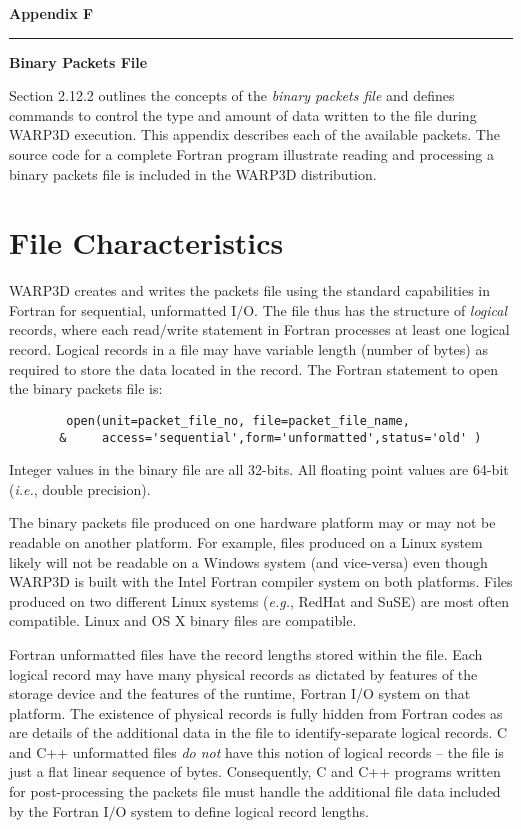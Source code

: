 \documentclass[10pt]{report}
\numberwithin{equation}{section}
\newcommand{\eg}{\ti{e.g.},\xspace}
\newcommand{\ie}{\ti{i.e.},\xspace}
\newcommand{\ti}{\emph}
\begin{document}
\LARGE
\hfill
\textbf{Appendix F}
\rule[0.15in]{450pt}{0.5mm}
\LARGE
\begin{flushright}
 \textbf{
{\selectfont Binary Packets File}}
\end{flushright}
\normalsize
%
%
Section 2.12.2 outlines the concepts of the \ti{binary packets file} and defines 
commands to control the type and amount of data
written to the file during WARP3D execution. This 
appendix describes each of the available packets. The source
code for a complete Fortran
program illustrate reading and processing a binary packets file
is included in the WARP3D distribution.
%
%
\section{File Characteristics }

WARP3D creates and writes the packets file using the standard capabilities in Fortran 
for sequential, unformatted I$/$O. The file thus has the structure of \ti{logical} records, 
where each read$/$write statement in Fortran processes at least one logical 
record. Logical records in a file may have variable length (number of bytes)
as required to store the data located 
in the record. The Fortran statement to open the binary packets file is:
\begin{verbatim}
        open(unit=packet_file_no, file=packet_file_name,   
       &     access='sequential',form='unformatted',status='old' )
\end{verbatim}
Integer values in the binary file are all 32-bits. All floating point values are
64-bit (\ie double precision).

The binary packets 
file produced on one hardware platform may or may not be readable on 
another platform. For example, files produced on a Linux system
likely will not be readable on a Windows system (and vice-versa) even though
WARP3D is built with the Intel Fortran compiler system on
both platforms. Files produced
on two different Linux systems (\eg RedHat and SuSE) are most often 
compatible. Linux and OS X binary files are compatible.

Fortran unformatted files have the record
lengths stored within the file. Each logical record
may have many physical records as dictated by features of the storage device
and the features of the runtime, Fortran I/O system on that platform. The
existence of physical records is fully hidden from Fortran codes as are details
of the additional data in the file to identify-separate logical records. C and C++ 
unformatted files \ti{do not} have this notion of logical records -- the file is just
a flat linear sequence of bytes. Consequently, C and C++ programs written for post-processing
the packets file must handle the additional file data included by the Fortran I$/$O system
to define logical record lengths.
\end{document}
